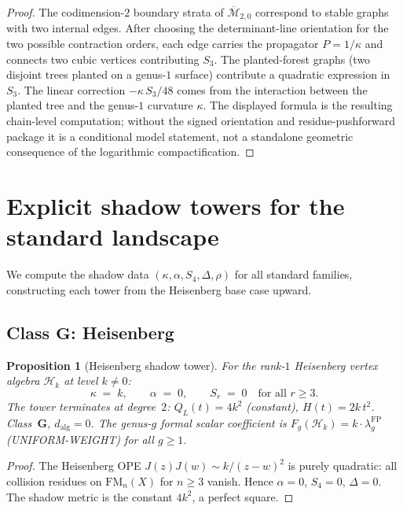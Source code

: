 \documentclass[11pt,reqno]{amsart}
\newtheorem{proposition}[theorem]{Proposition}
\theoremstyle{definition}
\theoremstyle{remark}
\newcommand{\cH}{\mathcal{H}}
\newcommand{\Mbar}{\overline{\mathcal{M}}}
\newcommand{\FM}{\mathrm{FM}}
\numberwithin{equation}{section}
\begin{document}
\begin{proof}
The codimension-$2$ boundary strata of $\Mbar_{2,0}$
correspond to stable graphs with two internal edges. After choosing
the determinant-line orientation for the two possible contraction
orders, each edge carries the propagator $P = 1/\kappa$ and connects
two cubic vertices contributing $S_3$. The planted-forest graphs
(two disjoint trees planted on a genus-$1$ surface) contribute a
quadratic expression in $S_3$. The linear correction
$-\kappa\, S_3/48$ comes from the interaction between the planted tree
and the genus-$1$ curvature $\kappa$. The displayed formula is the
resulting chain-level computation; without the signed orientation and
residue-pushforward package it is a conditional model statement, not a
standalone geometric consequence of the logarithmic compactification.
\end{proof}



\section{Explicit shadow towers for the standard
landscape}\label{sec:landscape}

We compute the shadow data
$(\kappa, \alpha, S_4, \Delta, \rho)$ for all standard
families, constructing each tower from the Heisenberg base
case upward.

\subsection{Class $\mathbf{G}$: Heisenberg}
\label{subsec:heisenberg}

\begin{proposition}[Heisenberg shadow
tower]\label{prop:heisenberg}
For the rank-$1$ Heisenberg vertex algebra $\cH_k$ at
level $k \ne 0$:
\[
 \kappa \;=\; k,
 \qquad
 \alpha \;=\; 0,
 \qquad
 S_r \;=\; 0 \quad\text{for all } r \ge 3.
\]
The tower terminates at degree~$2$:
$Q_L(t) = 4k^2$ (constant), $H(t) = 2k\, t^2$.
Class~$\mathbf{G}$, $d_{\mathrm{alg}} = 0$.
The genus-$g$ formal scalar coefficient is
$F_g(\cH_k) = k \cdot \lambda_g^{\mathrm{FP}}$
(UNIFORM-WEIGHT) for all $g \ge 1$.
\end{proposition}

\begin{proof}
The Heisenberg OPE $J(z)J(w) \sim k/(z-w)^2$ is purely
quadratic: all collision residues on $\FM_n(X)$ for
$n \ge 3$ vanish. Hence $\alpha = 0$, $S_4 = 0$,
$\Delta = 0$. The shadow metric is the constant $4k^2$,
a perfect square.
\end{proof}
\end{document}
